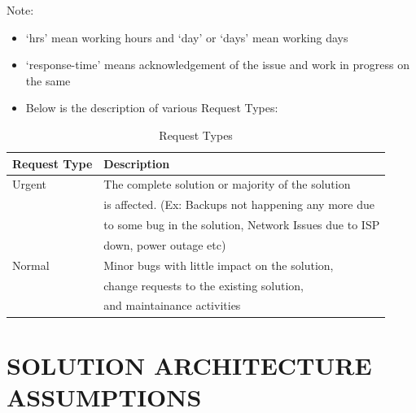 \documentclass[11pt]{article}
\begin{document}
Note: 
\begin{itemize}
\item `hrs' mean working hours and `day' or `days' mean working days
\item `response-time' means acknowledgement of the issue and work in progress on the same
\end{itemize}
 
\begin{itemize}
\item Below is the description of various Request Types:
\end{itemize}
\begin{table}[H]
\caption{\label{tbl:Request Types}Request Types}
\begin{center}
\begin{tabular}{ll}
\hline
 Request Type  &  Description                                             \\
\hline
 Urgent        &  The complete solution or majority of the solution       \\
               &  is affected. (Ex: Backups not happening any more due    \\
               &  to some bug in the solution, Network Issues due to ISP  \\
               &  down, power outage etc)                                 \\
 Normal        &  Minor bugs with little impact on the solution,          \\
               &  change requests to the existing solution,               \\
               &  and maintainance activities                             \\
\hline
\end{tabular}
\end{center}
\end{table}


\section{SOLUTION ARCHITECTURE ASSUMPTIONS}
\label{sec-6}
\end{document}
